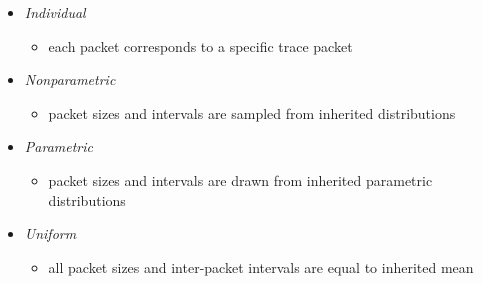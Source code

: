 \begin{itemize}
  \item \textit{Individual}
  \begin{itemize}
    \item each packet corresponds to a specific trace packet
  \end{itemize}
  \item \textit{Nonparametric}
  \begin{itemize}
    \item packet sizes and intervals are sampled from inherited distributions
  \end{itemize}
  \item \textit{Parametric}
  \begin{itemize}
    \item packet sizes and intervals are drawn from inherited parametric distributions
  \end{itemize}
  \item \textit{Uniform}
  \begin{itemize}
    \item all packet sizes and inter-packet intervals are equal to inherited mean
  \end{itemize}
\end{itemize}
